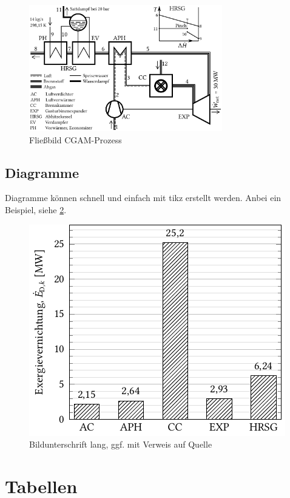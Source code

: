 \begin{figure}[h]
	\centering
	\includegraphics[width=0.75\textwidth]{bilder/02-cgam-komplett}
	\caption[Fließbild CGAM-Prozess]{Fließbild CGAM-Prozess}
	\label{fig:cgam-komplett}
\end{figure}

\subsection{Diagramme}
\label{subsec:diagramme}
Diagramme können schnell und einfach mit tikz erstellt werden. Anbei ein Beispiel, siehe \cref{fig:cgam-diagramm}.

\begin{figure}[h]
	\centering
	\includegraphics{bilder/03-cgam-diagramm.pdf}
	\caption[Bildunterschrift kurz, für Abbildungsverzeichnis]{Bildunterschrift lang, ggf. mit Verweis auf Quelle}
	\label{fig:cgam-diagramm}
\end{figure}


\clearpage

\section{Tabellen}
\label{sec:tabellen}

